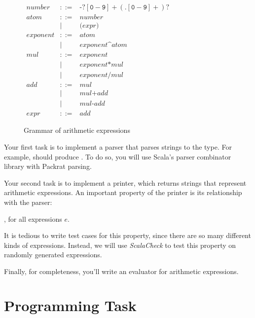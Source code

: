 \begin{figure}
\(
\begin{array}{rcl}
\mathit{number} & ::= & \texttt{-}?[\texttt{0}-\texttt{9}]+ (\texttt{.}[\texttt{0}-\texttt{9}]+)? \\
\mathit{atom} & ::= & \mathit{number} \\
              & \mid & \texttt{(} \mathit{expr} \texttt{)}  \\
\mathit{exponent} & ::= & \mathit{atom} \\
                 & \mid & \mathit{exponent} \texttt{\textasciicircum} \mathit{atom} \\
\mathit{mul} & ::= & \mathit{exponent} \\
& \mid & \mathit{exponent} \texttt{*} \mathit{mul} \\
& \mid & \mathit{exponent} \texttt{/} \mathit{mul} \\
\mathit{add} & ::= & \mathit{mul} \\
& \mid & \mathit{mul} \texttt{+} \mathit{add} \\
& \mid & \mathit{mul} \texttt{-} \mathit{add} \\
\mathit{expr} & ::= & \mathit{add}
\end{array}
\)
\caption{Grammar of arithmetic expressions}
\label{parsing_grammar}
\end{figure}

Your first task is to implement a parser that parses strings to the  type. For example,  should produce . To do so, you will use Scala's parser combinator library with Packrat parsing.

Your second task is to implement a printer, which returns strings that represent arithmetic expressions. An important property of the printer is its relationship with the parser:

, for all expressions $e$.

It is tedious to write test cases for this property, since there are so many different kinds of expressions. Instead, we will use \emph{ScalaCheck} to test this property on randomly generated expressions.

Finally, for completeness, you'll write an evaluator for arithmetic expressions.


\section{Programming Task}

